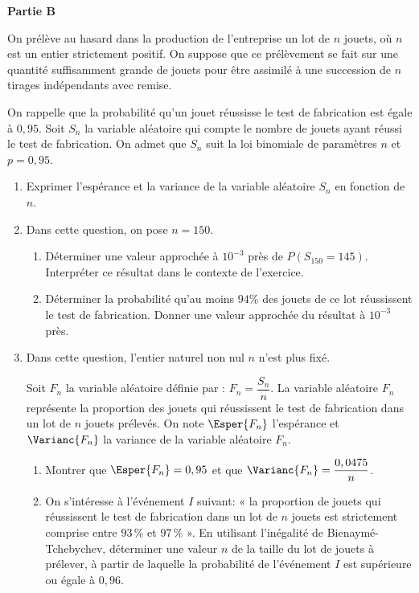 \textbf{Partie B}

\medskip

On prélève au hasard dans la production de l'entreprise un lot de $n$ jouets, où $n$ est un entier strictement positif. On suppose que ce prélèvement se fait sur une quantité suffisamment grande de jouets pour être assimilé à une succession de $n$ tirages indépendants avec remise.

\smallskip

On rappelle que la probabilité qu'un jouet réussisse le test de fabrication est égale à $0,95$. Soit $S_{n}$ la variable aléatoire qui compte le nombre de jouets ayant réussi le test de fabrication. On admet que $S_{n}$ suit la loi binomiale de paramètres $n$ et $p=0,95$.

\begin{enumerate}
	\item Exprimer l'espérance et la variance de la variable aléatoire $S_{n}$ en fonction de $n$.
	\item Dans cette question, on pose $n=150$.
	\begin{enumerate}
		\item Déterminer une valeur approchée à $10^{-3}$ près de $P\left(S_{150}=145\right)$. Interpréter ce résultat dans le contexte de l'exercice.
		\item Déterminer la probabilité qu'au moins $94\%$ des jouets de ce lot réussissent le test de fabrication. Donner une valeur approchée du résultat à $10^{-3}$ près.
	\end{enumerate}
	\item Dans cette question, l'entier naturel non nul $n$ n'est plus fixé.
	
	Soit $F_{n}$ la variable aléatoire définie par : $F_{n}=\dfrac{S_{n}}{n}$. La variable aléatoire $F_{n}$ représente la proportion des jouets qui réussissent le test de fabrication dans un lot de $n$ jouets prélevés. On note $\Esper{F_{n}}$ l'espérance et $\Varianc{F_{n}}$ la variance de la variable aléatoire $F_{n}$.
	\begin{enumerate}
		\item Montrer que $\Esper{F_{n}}=0,95$ et que $\Varianc{F_{n}}=\dfrac{0,0475}{n}$.
		\item On s'intéresse à l'événement $I$ suivant: « la proportion de jouets qui réussissent le test de fabrication dans un lot de $n$ jouets est strictement comprise entre $93\,\%$ et $97\,\%$ ». En utilisant l'inégalité de Bienaymé-Tchebychev, déterminer une valeur $n$ de la taille du lot de jouets à prélever, à partir de laquelle la probabilité de l'événement $I$ est supérieure ou égale à $0,96$.
	\end{enumerate}
\end{enumerate}
